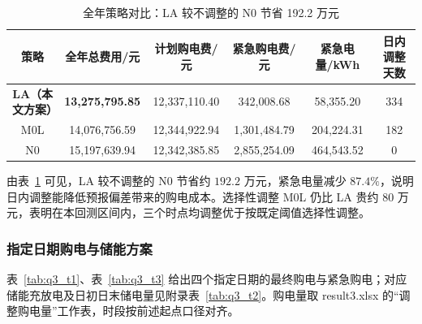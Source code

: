 \begin{table}[!htbp]
  \centering
  \footnotesize
  \setlength{\tabcolsep}{4pt}
  \caption{全年策略对比：LA 较不调整的 N0 节省 192.2 万元}
  \label{tab:q3_cmp}


  \begin{tabular}{cccccc}
    \toprule

    \rowcolor{headerblue}
    策略 
      & 全年总费用/元 
      & 计划购电费/元 
      & 紧急购电费/元 
      & 紧急电量/kWh 
      & 日内调整天数 \\

    \midrule

    \textbf{LA（本文方案）} 
      & \textbf{13,275,795.85} 
      & 12,337,110.40 
      & 342,008.68 
      & 58,355.20 
      & 334 \\

    \rowcolor{rowblue}
    M0L 
      & 14,076,756.59 
      & 12,344,922.94 
      & 1,301,484.79 
      & 204,224.31 
      & 182 \\

    N0 
      & 15,197,639.94 
      & 12,342,385.85 
      & 2,855,254.09 
      & 464,543.52 
      & 0 \\

    \bottomrule
  \end{tabular}
\end{table}

由表~\ref{tab:q3_cmp} 可见，LA 较不调整的 N0 节省约 $192.2$ 万元，紧急电量减少 $87.4\%$，说明日内调整能降低预报偏差带来的购电成本。选择性调整 M0L 仍比 LA 贵约 $80$ 万元，表明在本回测区间内，三个时点均调整优于按既定阈值选择性调整。

\subsubsection{指定日期购电与储能方案}

表~\ref{tab:q3_t1}、表~\ref{tab:q3_t3} 给出四个指定日期的最终购电与紧急购电；对应储能充放电及日初日末储电量见附录表~\ref{tab:q3_t2}。购电量取 result3.xlsx 的``调整购电量''工作表，时段按前述起点口径对齐。

